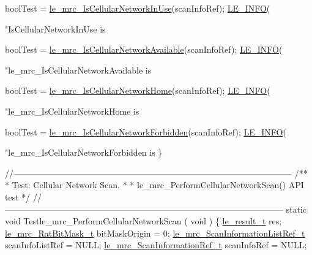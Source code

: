 \begin{DoxyCodeInclude}
{{    boolTest = \hyperlink{le__mrc__interface_8h_a4c859fc1364c183aa1d26a022db365c6}{le\_mrc\_IsCellularNetworkInUse}(scanInfoRef);
    \hyperlink{le__log_8h_a23e6d206faa64f612045d688cdde5808}{LE\_INFO}(\textcolor{stringliteral}{"IsCellularNetworkInUse is %

    boolTest = \hyperlink{le__mrc__interface_8h_a72ca8072f90d453169baff44441c41c0}{le\_mrc\_IsCellularNetworkAvailable}(scanInfoRef);
    \hyperlink{le__log_8h_a23e6d206faa64f612045d688cdde5808}{LE\_INFO}(\textcolor{stringliteral}{"le\_mrc\_IsCellularNetworkAvailable is %

    boolTest = \hyperlink{le__mrc__interface_8h_a7333dfc638f50524f9c6fd81457828ba}{le\_mrc\_IsCellularNetworkHome}(scanInfoRef);
    \hyperlink{le__log_8h_a23e6d206faa64f612045d688cdde5808}{LE\_INFO}(\textcolor{stringliteral}{"le\_mrc\_IsCellularNetworkHome is %

    boolTest = \hyperlink{le__mrc__interface_8h_a699a52d014550124a5b3362ee888a780}{le\_mrc\_IsCellularNetworkForbidden}(scanInfoRef);
    \hyperlink{le__log_8h_a23e6d206faa64f612045d688cdde5808}{LE\_INFO}(\textcolor{stringliteral}{"le\_mrc\_IsCellularNetworkForbidden is %
\}


\textcolor{comment}{//--------------------------------------------------------------------------------------------------}\textcolor{comment}{}
\textcolor{comment}{/**}
\textcolor{comment}{ * Test: Cellular Network Scan.}
\textcolor{comment}{ *}
\textcolor{comment}{ * le\_mrc\_PerformCellularNetworkScan() API test}
\textcolor{comment}{ */}
\textcolor{comment}{//--------------------------------------------------------------------------------------------------}
\textcolor{keyword}{static} \textcolor{keywordtype}{void} Testle\_mrc\_PerformCellularNetworkScan
(
    \textcolor{keywordtype}{void}
)
\{
    \hyperlink{le__basics_8h_a1cca095ed6ebab24b57a636382a6c86c}{le\_result\_t} res;
    \hyperlink{le__mrc__interface_8h_af643c7005da7f2466302eebdf7a29d93}{le\_mrc\_RatBitMask\_t} bitMaskOrigin = 0;
    \hyperlink{le__mrc__interface_8h_a25a9e79cc9078e22cec22444fd959c61}{le\_mrc\_ScanInformationListRef\_t} scanInfoListRef = NULL;
    \hyperlink{le__mrc__interface_8h_a3e7fe3e0d8f10fe7853f00eb254529ea}{le\_mrc\_ScanInformationRef\_t}     scanInfoRef = NULL;

}}}}}}
\end{DoxyCodeInclude}
